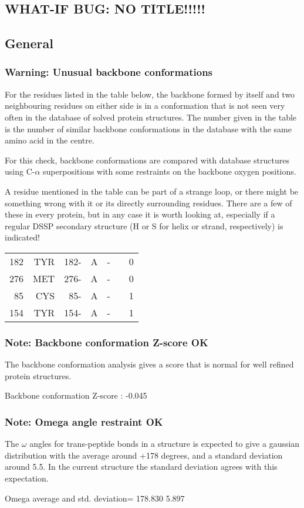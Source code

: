 \documentclass[a4paper]{article}
\def\showsect#1{
  \thesect\gdef\thesect{}
  \thessect\gdef\thessect{}
  \subsubsection{#1}
}
\gdef\thesect{\pagebreak[2]\section{WHAT-IF BUG: NO TITLE!!!!!}}
\gdef\thessect{\subsection{General}}
\begin{document}
\begin{warning}
\showsect{Warning: Unusual backbone conformations}
For the residues listed in the table below, the backbone formed by itself and
two neighbouring residues on either side is in a conformation that is not
seen very often in the database of solved protein structures. The number
given in the table is the number of similar backbone conformations in the
database with the same amino acid in the centre.
 
For this check, backbone conformations are compared with database structures
using C-$\alpha$ superpositions with some restraints on the backbone oxygen
positions.
 
A residue mentioned in the table can be part of a strange loop, or there
might be something wrong with it or its directly surrounding residues. There
are a few of these in every protein, but in any case it is worth looking at,
especially if a regular DSSP secondary structure (H or S for helix or strand,
respectively) is indicated!
 
\begin{center}
 
\begin{supertabular}{rr@{ (}r@{) }rlll}
  182&TYR & 182-&A &-& &    0\\
  276&MET & 276-&A &-& &    0\\
   85&CYS &  85-&A &-& &    1\\
  154&TYR & 154-&A &-& &    1\\
\end{supertabular}\end{center}
\end{warning}

\begin{note}
\showsect{Note: Backbone conformation Z-score OK}
The backbone conformation analysis gives a score that is normal for well
refined protein structures.
 
\parbox{1\textwidth}{
 Backbone conformation Z-score : -0.045
}%
 
\end{note}

\begin{note}
\showsect{Note: Omega angle restraint OK}
The $\omega$ angles for trans-peptide bonds in a structure is expected to give a
gaussian distribution with the average around +178 degrees, and a standard
deviation around 5.5. In the current structure the standard deviation agrees
with this expectation.
 
\parbox{1\textwidth}{
Omega average and std. deviation= 178.830 5.897
}%
 
\end{note}
\end{document}
